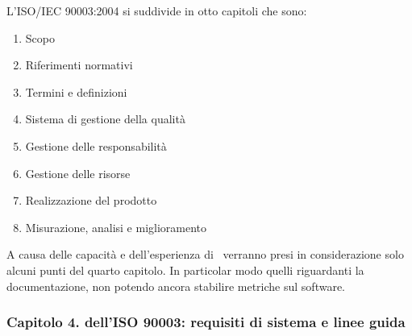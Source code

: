 	L'ISO/IEC 90003:2004 si suddivide in otto capitoli che sono:
	
	\begin{enumerate}
		\item Scopo
		\item Riferimenti normativi
		\item Termini e definizioni
		\item Sistema di gestione della qualità
		\item Gestione delle responsabilità
		\item Gestione delle risorse
		\item Realizzazione del prodotto
		\item Misurazione, analisi e miglioramento
	\end{enumerate}

	A causa delle capacità e dell'esperienza di \gruppo\, verranno presi in considerazione solo alcuni punti del quarto capitolo. In particolar modo quelli riguardanti la documentazione, non potendo ancora stabilire metriche sul software.
	
	\subsubsection{Capitolo 4. dell'ISO 90003: requisiti di sistema e linee guida}
	
